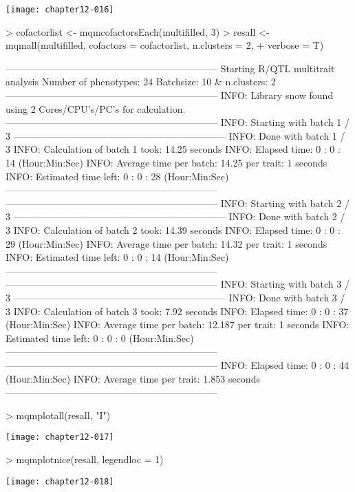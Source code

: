 \documentclass[a4paper]{article}
\begin{document}
\texttt{[image: chapter12-016]}
\begin{Schunk}
\begin{Sinput}
> cofactorlist <- mqmcofactorsEach(multifilled, 3)
> resall <- mqmall(multifilled, cofactors = cofactorlist, n.clusters = 2, 
+     verbose = T)
\end{Sinput}
\begin{Soutput}
------------------------------------------------------------------
Starting R/QTL multitrait analysis
Number of phenotypes: 24 
Batchsize: 10  & n.clusters: 2 
------------------------------------------------------------------
INFO: Library snow found using  2  Cores/CPU's/PC's for calculation.
------------------------------------------------------------------
INFO: Starting with batch 1 / 3 
------------------------------------------------------------------
INFO: Done with batch 1 / 3 
INFO: Calculation of batch 1 took: 14.25 seconds
INFO: Elapsed time: 0 : 0 : 14 (Hour:Min:Sec)
INFO: Average time per batch: 14.25  per trait: 1 seconds
INFO: Estimated time left: 0 : 0 : 28 (Hour:Min:Sec)
------------------------------------------------------------------
------------------------------------------------------------------
INFO: Starting with batch 2 / 3 
------------------------------------------------------------------
INFO: Done with batch 2 / 3 
INFO: Calculation of batch 2 took: 14.39 seconds
INFO: Elapsed time: 0 : 0 : 29 (Hour:Min:Sec)
INFO: Average time per batch: 14.32  per trait: 1 seconds
INFO: Estimated time left: 0 : 0 : 14 (Hour:Min:Sec)
------------------------------------------------------------------
------------------------------------------------------------------
INFO: Starting with batch 3 / 3 
------------------------------------------------------------------
INFO: Done with batch 3 / 3 
INFO: Calculation of batch 3 took: 7.92 seconds
INFO: Elapsed time: 0 : 0 : 37 (Hour:Min:Sec)
INFO: Average time per batch: 12.187  per trait: 1 seconds
INFO: Estimated time left: 0 : 0 : 0 (Hour:Min:Sec)
------------------------------------------------------------------
------------------------------------------------------------------
INFO: Elapsed time: 0 : 0 : 44 (Hour:Min:Sec)
INFO: Average time per trait: 1.853 seconds
------------------------------------------------------------------
\end{Soutput}
\begin{Sinput}
> mqmplotall(resall, "I")
\end{Sinput}
\end{Schunk}
\texttt{[image: chapter12-017]}
\begin{Schunk}
\begin{Sinput}
> mqmplotnice(resall, legendloc = 1)
\end{Sinput}
\end{Schunk}
\texttt{[image: chapter12-018]}
\end{document}
